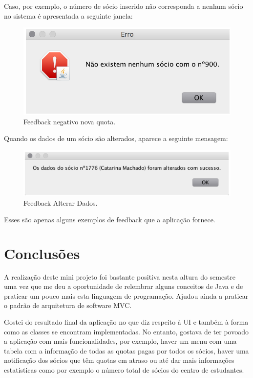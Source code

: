 \documentclass[a4paper]{article}
\begin{document}
Caso, por exemplo, o número de sócio inserido não corresponda a nenhum sócio no sistema é apresentada a seguinte janela:

\begin{figure}[H]
\centering
\includegraphics[scale=0.35]{imgs/feedbackNegaNovaQ.png}
\caption{Feedback negativo nova quota.}
\label{img:feedbackNegaNovaQ}
\end{figure}


Quando os dados de um sócio são alterados, aparece a seguinte mensagem:

\begin{figure}[H]
\centering
\includegraphics[scale=0.35]{imgs/feedbackAlterarDados.png}
\caption{Feedback Alterar Dados.}
\label{img:feedbackAlterarDados}
\end{figure}

Esses são apenas alguns exemplos de feedback que a aplicação fornece.

\section{Conclusões}
\label{sec:conclusao}

A realização deste mini projeto foi bastante positiva nesta altura do semestre uma vez que me deu a oportunidade de relembrar alguns conceitos de Java e de praticar um pouco mais esta linguagem de programação. Ajudou ainda a praticar o padrão de arquitetura de software MVC.

Gostei do resultado final da aplicação no que diz respeito à UI e também à forma como as classes se encontram implementadas. No entanto, gostava de ter povoado a aplicação com mais funcionalidades, por exemplo, haver um menu com uma tabela com a informação de todas as quotas pagas por todos os sócios, haver uma notificação dos sócios que têm quotas em atraso ou até dar mais informações estatísticas como por exemplo o número total de sócios do centro de estudantes.
\end{document}

